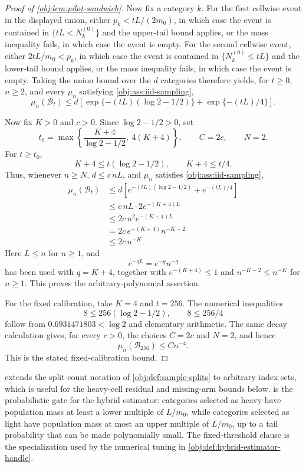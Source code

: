 \documentclass[11pt]{article}
\begin{document}
\begin{proof}[Proof of \cref{obj:lem:pilot-sandwich}]
Now fix a category \(k\). For the first cellwise event in the displayed union, either
\(p_k<tL/(2m_0)\), in which case the event is contained in \(\{tL<N_k^{(0)}\}\) and the upper-tail bound applies, or the mass inequality fails, in which case the event is empty. For the second cellwise event, either \(2tL/m_0<p_k\), in which case the event is contained in \(\{N_k^{(0)}\le tL\}\) and the lower-tail bound applies, or the mass inequality fails, in which case the event is empty. Taking the union bound over the \(d\) categories therefore yields, for \(t\ge0\), \(n\ge2\), and every \(\mu_n\) satisfying \cref{obj:ass:iid-sampling},
\[
\mu_n(\mathcal B_t)
\le
d\left[
\exp\{-(tL)(\log 2-1/2)\}
+
\exp\{-(tL)/4\}
\right].
\]

Now fix \(K>0\) and \(c>0\). Since \(\log 2-1/2>0\), set
\[
t_0
=
\max\left\{
\frac{K+4}{\log 2-1/2},\ 4(K+4)
\right\},
\qquad
C=2c,
\qquad
N=2 .
\]
For \(t\ge t_0\),
\[
K+4\le t(\log 2-1/2),
\qquad
K+4\le t/4 .
\]
Thus, whenever \(n\ge N\), \(d\le c\,nL\), and \(\mu_n\) satisfies \cref{obj:ass:iid-sampling},
\[
\begin{aligned}
\mu_n(\mathcal B_t)
&\le d\left[
e^{-(tL)(\log 2-1/2)}+e^{-(tL)/4}
\right] \\
&\le
c\,nL\cdot 2e^{-(K+4)L} \\
&\le 2c\,n^2 e^{-(K+4)L} \\
&=2c\,e^{-(K+4)}n^{-K-2} \\
&\le 2c\,n^{-K}.
\end{aligned}
\]
Here \(L\le n\) for \(n\ge1\), and
\[
e^{-qL}=e^{-q}n^{-q}
\]
has been used with \(q=K+4\), together with \(e^{-(K+4)}\le1\) and
\(n^{-K-2}\le n^{-K}\) for \(n\ge1\). This proves the arbitrary-polynomial assertion.

For the fixed calibration, take \(K=4\) and \(t=256\). The numerical inequalities
\[
8\le256(\log 2-1/2),
\qquad
8\le256/4
\]
follow from \(0.6931471803<\log 2\) and elementary arithmetic. The same decay calculation gives, for every \(c>0\), the choices \(C=2c\) and \(N=2\), and hence
\[
\mu_n(\mathcal B_{256})\le Cn^{-4}.
\]
This is the stated fixed-calibration bound.
\end{proof}

 extends the split-count notation of \cref{obj:def:sample-splits} to arbitrary index sets, which is useful for the heavy-cell residual and missing-arm bounds below.  is the probabilistic gate for the hybrid estimator: categories selected as heavy have population mass at least a lower multiple of \(L/m_0\), while categories selected as light have population mass at most an upper multiple of \(L/m_0\), up to a tail probability that can be made polynomially small. The fixed-threshold clause is the specialization used by the numerical tuning in \cref{obj:def:hybrid-estimator-handle}.
\end{document}
